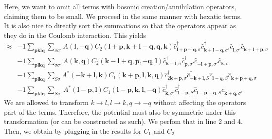 Here, we want to omit all terms with bosonic creation/annihilation operators, claiming them to be small. We proceed in the same manner with hexatic terms.
It is also nice to directly sort the summations so that the operators appear as they do in the Coulomb interaction. This yields
\begin{align*}
	[\eta, H'] \approx 	&-1 \sum_{ \mathbf{p} \mathbf{k} \mathbf{l} \mathbf{q} } \sum_{ \sigma \sigma' } A( \mathbf{l}, -\mathbf{q} )  C_2( \mathbf{l}+\mathbf{p}, \mathbf{k}+\mathbf{l}-\mathbf{q}, \mathbf{q}, \mathbf{k} )   \hat{c}_{ \mathbf{l}+\mathbf{p}+\mathbf{q}, \sigma }^\dagger  \hat{c}_{ \mathbf{k}+\mathbf{l}-\mathbf{q}, \sigma' }^\dagger  \hat{c}_{ \mathbf{l}, \sigma' }^{\phantom{\dagger}} \hat{c}_{ \mathbf{k}+\mathbf{l}+\mathbf{p}, \sigma }^{\phantom{\dagger}}  \\
	&-1 \sum_{ \mathbf{p} \mathbf{l} \mathbf{k} \mathbf{q} } \sum_{ \sigma \sigma' } A( \mathbf{k}, \mathbf{q} )  C_2( \mathbf{k}-\mathbf{l}+\mathbf{q}, \mathbf{p}, -\mathbf{q}, \mathbf{l} )   \hat{c}_{ \mathbf{k}-\mathbf{l}, \sigma }^\dagger  \hat{c}_{ \mathbf{p}, \sigma' }^\dagger  \hat{c}_{ -\mathbf{l}+\mathbf{p}, \sigma' }^{\phantom{\dagger}} \hat{c}_{ \mathbf{k}, \sigma }^{\phantom{\dagger}}  \\
	&-1 \sum_{ \mathbf{p} \mathbf{l} \mathbf{k} \mathbf{q} } \sum_{ S \sigma } A^*( -\mathbf{k}+\mathbf{l}, \mathbf{k} )  C_1( \mathbf{k}+\mathbf{p}, \mathbf{l}, \mathbf{k}, \mathbf{q} )   \hat{c}_{ 2\mathbf{k}+\mathbf{p}, \sigma }^\dagger  \hat{c}_{ -\mathbf{k}+\mathbf{l}, S }^\dagger  \hat{c}_{ \mathbf{l}-\mathbf{q}, S }^{\phantom{\dagger}} \hat{c}_{ \mathbf{k}+\mathbf{p}+\mathbf{q}, \sigma }^{\phantom{\dagger}}  \\
	&-1 \sum_{ \mathbf{p} \mathbf{k} \mathbf{l} \mathbf{q} } \sum_{ S \sigma' } A^*( \mathbf{l}-\mathbf{p}, \mathbf{l} )  C_1( \mathbf{l}-\mathbf{p}, \mathbf{k}, \mathbf{l}, -\mathbf{q} )   \hat{c}_{ \mathbf{k}, \sigma' }^\dagger  \hat{c}_{ \mathbf{l}-\mathbf{p}, S }^\dagger  \hat{c}_{ \mathbf{l}-\mathbf{p}-\mathbf{q}, S }^{\phantom{\dagger}} \hat{c}_{ \mathbf{k}+\mathbf{q}, \sigma' }^{\phantom{\dagger}} 
\end{align*}
\newpage
We are allowed to transform $k \to l, l \to k, q \to -q$ without affecting the operators part of the terms. Therefore, the potential must also be symmetric under this transformation (or can be constructed as such). We perfom that in line 2 and 4. Then, we obtain by plugging in the results for $C_1$ and $C_2$
